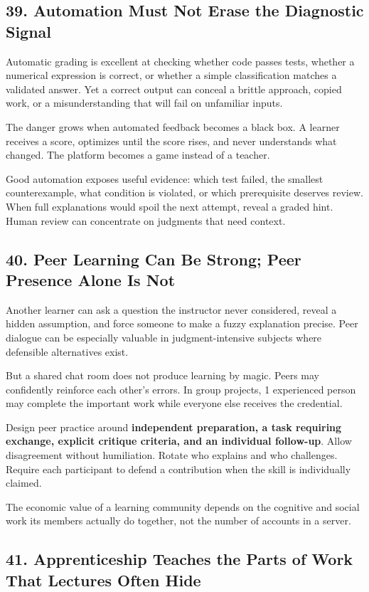 \subsection*{39. Automation Must Not Erase the Diagnostic Signal}

Automatic grading is excellent at checking whether code passes tests, whether a numerical expression is correct, or whether a simple classification matches a validated answer. Yet a correct output can conceal a brittle approach, copied work, or a misunderstanding that will fail on unfamiliar inputs.

The danger grows when automated feedback becomes a black box. A learner receives a score, optimizes until the score rises, and never understands what changed. The platform becomes a game instead of a teacher.

Good automation exposes useful evidence: which test failed, the smallest counterexample, what condition is violated, or which prerequisite deserves review. When full explanations would spoil the next attempt, reveal a graded hint. Human review can concentrate on judgments that need context.

\subsection*{40. Peer Learning Can Be Strong; Peer Presence Alone Is Not}

Another learner can ask a question the instructor never considered, reveal a hidden assumption, and force someone to make a fuzzy explanation precise. Peer dialogue can be especially valuable in judgment-intensive subjects where defensible alternatives exist.

But a shared chat room does not produce learning by magic. Peers may confidently reinforce each other's errors. In group projects, 1 experienced person may complete the important work while everyone else receives the credential.

Design peer practice around \textbf{independent preparation, a task requiring exchange, explicit critique criteria, and an individual follow-up}. Allow disagreement without humiliation. Rotate who explains and who challenges. Require each participant to defend a contribution when the skill is individually claimed.

The economic value of a learning community depends on the cognitive and social work its members actually do together, not the number of accounts in a server.

\subsection*{41. Apprenticeship Teaches the Parts of Work That Lectures Often Hide}

